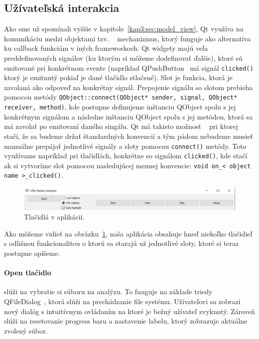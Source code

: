 \subsection{Užívateľská interakcia}
Ako sme už spomínali vyššie v kapitole~\ref{kap3:sec:model_view}, Qt využíva na komunikáciu medzi objektami tzv. ~\cite{signal_slot} mechanizmus, ktorý funguje ako alternatíva ku callback funkciám v iných frameworkoch. Qt widgety majú veľa preddefinovaných signálov (ku ktorým si môžeme dodefinovať ďalšie), ktoré sú emitované pri konkrétnom evente (napríklad QPushButton~\cite{qpushbutton} má signál \texttt{clicked()} ktorý je emitnutý pokiaľ je dané tlačidlo stlačené). Slot je funkcia, ktorá je zavolaná ako odpoveď na konkrétny signál. Prepojenie signálu so slotom prebieha pomocou metódy \texttt{QObject::connect(QObject* sender, signal, QObject* receiver, method)}, kde postupne definujeme inštanciu QObject spolu s jej konkrétnym signálom a následne inštanciu QObject spolu s jej metódou, ktorá sa má zavolať po emitovaní daného singálu. Qt má takisto možnosť ~\cite{qt_autoconnect} pri ktorej stačí, že sa budeme držať štandardných konvencií a tým pádom nebudeme musieť manuálne prepájať jednotlivé signály a sloty pomocou \texttt{connect()} metódy. Toto využívame napríklad pri tlačidlách, konkrétne so signálom \texttt{clicked()}, kde stačí ak si vytvoríme slot pomocou nasledujúcej mennej konvencie: \texttt{void on\_\textless~object name~\textgreater\_clicked()}.

\begin{figure}[!htb]
	\centering
	\includegraphics[width=\textwidth]{img/kap04_arch_buttons}
	\caption{Tlačidlá v aplikácii.}
	\label{obr:kap4:arch:buttons}
\end{figure}

Ako môžeme vidieť na obrázku~\ref{obr:kap4:arch:buttons}, naša aplikácia obsahuje hneď niekoľko tlačidieľ s odlišnou funkcionalitou o ktorú sa starajú už jednotlivé sloty, ktoré si teraz postupne opíšeme.

\paragraph{Open tlačidlo}
\label{kap04:sec:open_button}

slúži na vybratie si súboru na analýzu. To funguje na základe triedy QFileDialog~\cite{qfiledialog}, ktorá slúži na prechádzanie file systému. Užívateľovi sa zobrazí nový dialóg s intuitívnym ovládaním na ktoré je bežný užívateľ zvyknutý. Zároveň slúži na resetovanie progress baru a nastavenie labelu, ktorý zobrazuje aktuálne zvolený súbor.

